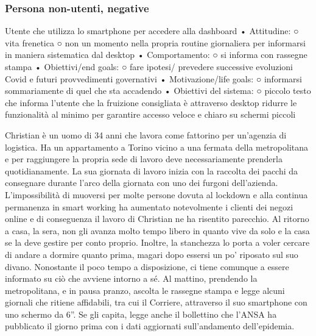 \subsubsection*{Persona non-utenti, negative}
Utente che utilizza lo smartphone per accedere alla dashboard
	• Attitudine:
		○ vita frenetica
		○ non un momento nella propria routine giornaliera per informarsi in maniera sistematica dal desktop
	• Comportamento: 
		○ si informa con rassegne stampa
	• Obiettivi/end goals: 
		○ fare ipotesi/ prevedere successive evoluzioni Covid e futuri provvedimenti governativi
	• Motivazione/life goals: 
		○ informarsi sommariamente di quel che sta accadendo
	• Obiettivi del sistema:
		○ piccolo testo che informa l'utente che la fruizione consigliata è attraverso desktop
ridurre le funzionalità al minimo per garantire accesso veloce e chiaro su schermi piccoli

Christian è un uomo di 34 anni che lavora come fattorino per un'agenzia di logistica.
Ha un appartamento a Torino vicino a una fermata della metropolitana e per raggiungere la propria sede di lavoro deve necessariamente prenderla quotidianamente. La sua giornata di lavoro inizia con la raccolta dei pacchi da consegnare durante l'arco della giornata con uno dei furgoni dell'azienda. L'impossibilità di muoversi per molte persone dovuta al lockdown e alla continua permanenza in smart working ha aumentato notevolmente i clienti dei negozi online e di conseguenza il lavoro di Christian ne ha risentito parecchio. Al ritorno a casa, la sera, non gli avanza molto tempo libero in quanto vive da solo e la casa se la deve gestire per conto proprio. Inoltre, la stanchezza lo porta a voler cercare di andare a dormire quanto prima, magari dopo essersi un po' riposato sul suo divano.
Nonostante il poco tempo a disposizione, ci tiene comunque a essere informato su ciò che avviene intorno a sé. Al mattino, prendendo la metropolitana, e in pausa pranzo, ascolta le rassegne stampa e legge alcuni giornali che ritiene affidabili, tra cui il Corriere, attraverso il suo smartphone con uno schermo da 6''. Se gli capita, legge anche il bollettino che l'ANSA ha pubblicato il giorno prima con i dati aggiornati sull'andamento dell'epidemia.


